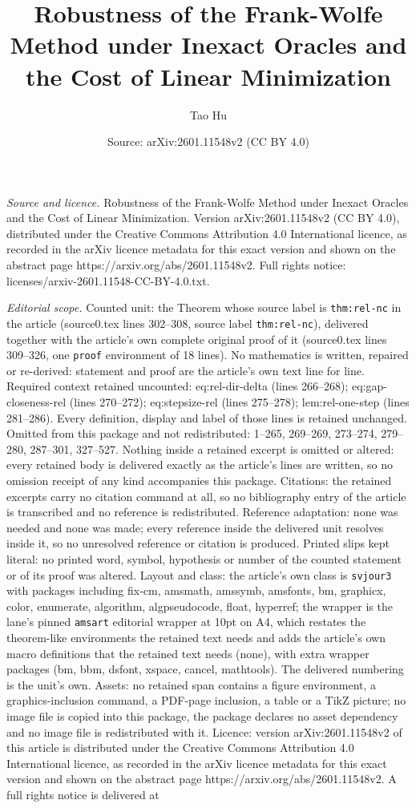 \documentclass[10pt,a4paper]{amsart}
\title[Robustness of the Frank-Wolfe Method under Inexact Oracles a]{Robustness of the Frank-Wolfe Method under Inexact Oracles and the Cost of Linear Minimization}
\author{Tao Hu}
\date{Source: arXiv:2601.11548v2 (CC BY 4.0)}
\begin{document}
\maketitle

\noindent\emph{Source and licence.} Robustness of the Frank-Wolfe Method under Inexact Oracles and the Cost of Linear Minimization. Version arXiv:2601.11548v2 (CC BY 4.0), distributed under the Creative Commons Attribution 4.0 International licence, as recorded in the arXiv licence metadata for this exact version and shown on the abstract page https://arxiv.org/abs/2601.11548v2. Full rights notice: licenses/arxiv-2601.11548-CC-BY-4.0.txt.\par\smallskip

\noindent\textit{Editorial scope.} Counted unit: the Theorem whose source label is \texttt{thm:rel-nc} in the article (source0.tex lines 302--308, source label \texttt{thm:rel-nc}), delivered together with the article's own complete original proof of it (source0.tex lines 309--326, one \texttt{proof} environment of 18 lines). No mathematics is written, repaired or re-derived: statement and proof are the article's own text line for line. Required context retained uncounted: eq:rel-dir-delta (lines 266--268); eq:gap-closeness-rel (lines 270--272); eq:stepsize-rel (lines 275--278); lem:rel-one-step (lines 281--286). Every definition, display and label of those lines is retained unchanged. Omitted from this package and not redistributed: 1--265, 269--269, 273--274, 279--280, 287--301, 327--527. Nothing inside a retained excerpt is omitted or altered: every retained body is delivered exactly as the article's lines are written, so no omission receipt of any kind accompanies this package. Citations: the retained excerpts carry no citation command at all, so no bibliography entry of the article is transcribed and no reference is redistributed. Reference adaptation: none was needed and none was made; every reference inside the delivered unit resolves inside it, so no unresolved reference or citation is produced. Printed slips kept literal: no printed word, symbol, hypothesis or number of the counted statement or of its proof was altered. Layout and class: the article's own class is \texttt{svjour3} with packages including fix-cm, amsmath, amssymb, amsfonts, bm, graphicx, color, enumerate, algorithm, algpseudocode, float, hyperref; the wrapper is the lane's pinned \texttt{amsart} editorial wrapper at 10pt on A4, which restates the theorem-like environments the retained text needs and adds the article's own macro definitions that the retained text needs (none), with extra wrapper packages (bm, bbm, dsfont, xspace, cancel, mathtools). The delivered numbering is the unit's own. Assets: no retained span contains a figure environment, a graphics-inclusion command, a PDF-page inclusion, a table or a TikZ picture; no image file is copied into this package, the package declares no asset dependency and no image file is redistributed with it. Licence: version arXiv:2601.11548v2 of this article is distributed under the Creative Commons Attribution 4.0 International licence, as recorded in the arXiv licence metadata for this exact version and shown on the abstract page https://arxiv.org/abs/2601.11548v2. A full rights notice is delivered at 
\end{document}
